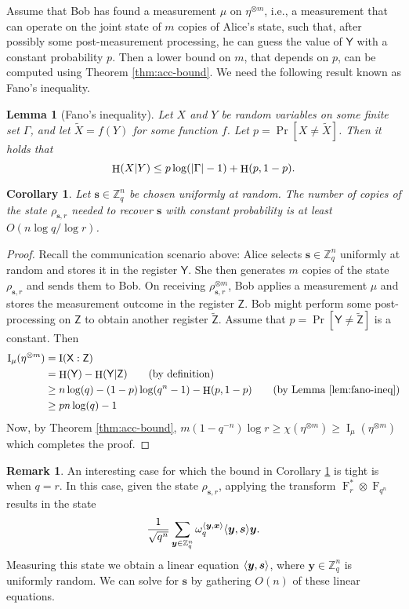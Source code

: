 \documentclass[11pt]{article}
\theoremstyle{plain}
\newtheorem{lemma}[theorem]{Lemma}
\newtheorem{corollary}[theorem]{Corollary}
\theoremstyle{definition}
\newtheorem*{remark}{Remark}
\DeclareMathOperator{\entpy}{H}
\DeclareMathOperator{\qft}{F}
\DeclarePairedDelimiter{\abs}{\lvert}{\rvert}
\let\ket\relax
\DeclarePairedDelimiter{\ket}{\lvert}{\rangle}
\DeclarePairedDelimiter{\lrang}{\langle}{\rangle}
\def\Z{\mathbb{Z}}
\begin{document}
Assume that Bob has found a measurement $\mu$ on $\eta^{\otimes m}$, i.e., a measurement that can operate on the joint state of $m$ copies of Alice's state, such that, after possibly some post-measurement processing, he can guess the value of $\mathsf{Y}$ with a constant probability $p$. Then a lower bound on $m$, that depends on $p$, can be computed using Theorem \ref{thm:acc-bound}. We need the following result known as Fano's inequality.
\begin{lemma}[Fano’s inequality]
    \label{lem:fano-ineq}
    Let $X$ and $Y$ be random variables on some finite set $\Gamma$, and let $\tilde{X} = f(Y)$ for some function $f$. Let $p = \Pr[X \ne \tilde{X}]$. Then it holds that
    \[ \entpy(X \vert Y) \le p\log(\abs{\Gamma} - 1) + \entpy(p, 1 - p). \]
\end{lemma}
\begin{corollary}
    \label{cor:lower-b}
    Let $\bm{s} \in \Z_q^n$ be chosen uniformly at random. The number of copies of the state $\rho_{\bm{s}, r}$ needed to recover $\bm{s}$ with constant probability is at least $O(n\log q / \log r)$.
\end{corollary}
\begin{proof}
    Recall the communication scenario above: Alice selects $\bm{s} \in \Z_q^n$ uniformly at random and stores it in the register $\mathsf{Y}$. She then generates $m$ copies of the state $\rho_{\bm{s}, r}$ and sends them to Bob. On receiving $\rho_{\bm{s}, r}^{\otimes m}$, Bob applies a measurement $\mu$ and stores the measurement outcome in the register $\mathsf{Z}$. Bob might perform some post-processing on $\mathsf{Z}$ to obtain another register $\tilde{\mathsf{Z}}$. Assume that $p = \Pr[\mathsf{Y} \ne \tilde{\mathsf{Z}}]$ is a constant. Then
    \begin{align*}
        \operatorname{I}_\mu(\eta^{\otimes m})
        & = \operatorname{I}(\mathsf{X} : \mathsf{Z}) \\
        & = \entpy(\mathsf{Y}) - \entpy(\mathsf{Y} \vert \mathsf{Z}) \tag{by definition} \\
        & \ge n\log(q) - (1 - p)\log(q^n - 1) - \entpy(p, 1 - p) \tag{by Lemma \ref{lem:fano-ineq}} \\
        & \ge pn\log(q) - 1
    \end{align*}
    Now, by Theorem \ref{thm:acc-bound}, $m(1 - q^{-n})\log r \ge \chi(\eta^{\otimes m}) \ge \operatorname{I}_\mu(\eta^{\otimes m})$ which completes the proof.
\end{proof}
\begin{remark}
    An interesting case for which the bound in Corollary \ref{cor:lower-b} is tight is when $q = r$. In this case, given the state $\rho_{\bm{s}, r}$, applying the transform $\qft_r^* \otimes \qft_{q^n}$ results in the state
    \[ \frac{1}{\sqrt{q^n}} \sum_{\bm{y} \in \Z_q^n} \omega_q^{\lrang{\bm{y}, \bm{x}}} \ket{\lrang{\bm{y}, \bm{s}}}\ket{\bm{y}}. \]
    Measuring this state we obtain a linear equation $\lrang{\bm{y}, \bm{s}}$, where $\bm{y} \in \Z_q^n$ is uniformly random. We can solve for $\bm{s}$ by gathering $O(n)$ of these linear equations. 
\end{remark}
\end{document}
